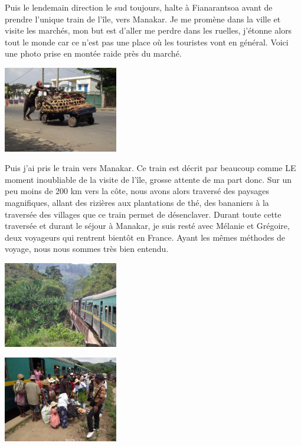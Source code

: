 \begin{multicols}{2}

Puis le lendemain direction le sud toujours, halte à Fianarantsoa avant de prendre l'unique train de l'île, vers Manakar. Je me promène dans la ville et visite les marchés, mon but est d'aller me perdre dans les ruelles, j'étonne alors tout le monde car ce n'est pas une place où les touristes vont en général. Voici une photo prise en montée raide près du marché.

\smallbreak
\hspace*{-0.65cm}
\includegraphics[width=5cm]{articles/Salut-vazaha/DSCF0151.JPG}
\smallbreak

Puis j'ai pris le train vers Manakar. Ce train est décrit par beaucoup comme LE moment inoubliable de la visite de l'île, grosse attente de ma part donc. Sur un peu moins de 200 km vers la côte, nous avons alors traversé des paysages magnifiques, allant des rizières aux plantations de thé, des bananiers à la traversée des villages que ce train permet de désenclaver. Durant toute cette traversée et durant le séjour à Manakar, je suis resté avec Mélanie et Grégoire, deux voyageurs qui rentrent bientôt en France. Ayant les mêmes méthodes de voyage, nous nous sommes très bien entendu.

\smallbreak

\smallbreak
\hspace*{-0.65cm}
\includegraphics[width=5cm]{articles/Salut-vazaha/DSCF0196.JPG}
\smallbreak

\smallbreak
\hspace*{-0.65cm}
\includegraphics[width=5cm]{articles/Salut-vazaha/DSCF0197.jpg}
\smallbreak


\end{multicols}
